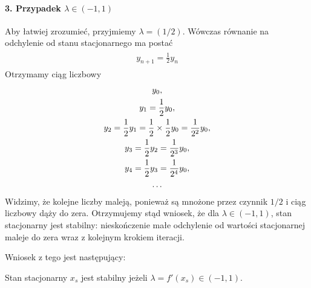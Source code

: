 \documentclass[a4paper,12pt,polish]{sphinxmanual}
\makeatletter
\renewenvironment{notice}[2]{\begin{icsebox}\def\py@noticetype{#1}\par\strong{#2}}{\end{icsebox}}\makeatother
\makeatother
\begin{document}
\paragraph{3. Przypadek $\lambda  \in (-1, 1)$}
\label{ch1/chI031:id2}
Aby łatwiej zrozumieć, przyjmiemy  $\lambda =  (1/2)$. Wówczas równanie na odchylenie od stanu stacjonarnego ma postać
\label{ch1/chI031:equation-eqn24}\begin{gather}
\begin{split}y_{n+1} = \frac{1}{2}  y_n\end{split}\label{ch1/chI031-eqn24}
\end{gather}
Otrzymamy ciąg liczbowy
\label{ch1/chI031:equation-eqn25}\begin{gather}
\begin{split} y_0,\end{split}\label{ch1/chI031-eqn25}\\\begin{split} y_1 =   \frac{1}{2} y_0,\end{split}\notag\\\begin{split} y_2 =  \frac{1}{2}  y_1 =  \frac{1}{2} \times \frac{1}{2}  y_0 =\frac{1}{2^2}  y_0,\end{split}\notag\\\begin{split} y_3 =  \frac{1}{2}  y_2 = \frac{1}{2^3}  y_0,\end{split}\notag\\\begin{split} y_4 =  \frac{1}{2}  y_3 = \frac{1}{2^4}  y_0,\end{split}\notag\\\begin{split} \dots\end{split}\notag
\end{gather}
Widzimy, że  kolejne  liczby maleją, ponieważ są mnożone przez czynnik $1/2$
i ciąg liczbowy dąży do zera. Otrzymujemy stąd wniosek, że dla $\lambda  \in (-1, 1)$,
stan stacjonarny  jest stabilny: nieskończenie małe odchylenie od wartości stacjonarnej
maleje do zera  wraz z kolejnym krokiem iteracji.

Wniosek z tego jest następujący:

\begin{notice}{note}{Uwaga:}
Stan stacjonarny $x_s$ jest stabilny jeżeli $\lambda = f'(x_s) \in (-1, 1)$.
\end{notice}
\end{document}
